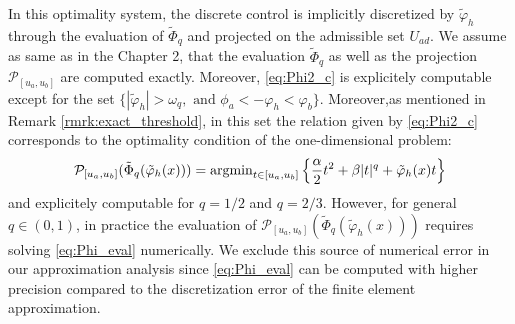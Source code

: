 In this optimality system, the discrete control is implicitly 
discretized by $\tilde\varphi_h$ through the evaluation of 
$\tilde\Phi_q$ and projected on the admissible set $U_{ad}$. 
We assume as same as in the Chapter 2, that the evaluation 
$\tilde\Phi_q$ as well as the 
projection $\mathcal{P}_{[u_a,u_b]}$ are computed exactly. 
Moreover, \eqref{eq:Phi2_c} is explicitely computable except for the set 
$\{|\tilde\varphi_h|>\omega_q, \text{ and } \phi_a <-\varphi_h < \varphi_b \}$. 
Moreover,as mentioned in Remark \ref{rmrk:exact_threshold}, in this set the relation given by \eqref{eq:Phi2_c} 
corresponds to the optimality condition of the one-dimensional problem:
\begin{equation}\label{eq:Phi_eval}
\mathcal{P}_{[u_a,u_b]}(\tilde\Phi_q (\tilde\varphi_h(x)))=\operatorname{argmin}_{t\in [u_a,u_b]} \left\{ \frac{\alpha}{2}t^2 + \beta |t|^q + \tilde\varphi_h(x) t \right\} 
\end{equation}
and explicitely computable for $q=1/2$ and $q=2/3$. However, for general $q \in (0,1)$, in practice 
the evaluation of $\mathcal{P}_{[u_a,u_b]}(\tilde\Phi_q (\tilde\varphi_h(x)))$ requires solving 
\eqref{eq:Phi_eval} numerically. We exclude this source of numerical error in our approximation analysis 
since \eqref{eq:Phi_eval} can be computed with higher precision compared to the discretization error of 
the finite element approximation.

%

